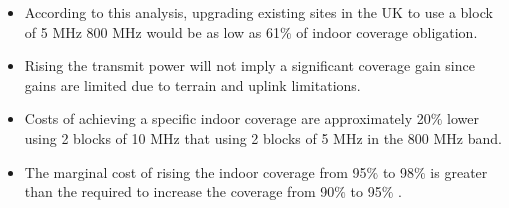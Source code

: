 \begin{itemize}
	\item According to this analysis, upgrading existing sites in the UK to use a block of 5 MHz 800 MHz would be as low as 61$\%$  of indoor coverage obligation.\par

	\item Rising the transmit power will not imply a significant coverage gain since gains are limited due to terrain and uplink limitations.\par

	\item Costs of achieving a specific indoor coverage are approximately 20$\%$  lower using 2 blocks of 10 MHz that using 2 blocks of 5 MHz in the 800 MHz band.\par

	\item The marginal cost of rising the indoor coverage from 95$\%$  to 98$\%$  is greater than the required to increase the coverage from 90$\%$  to 95$\%$ .
\end{itemize}\par

